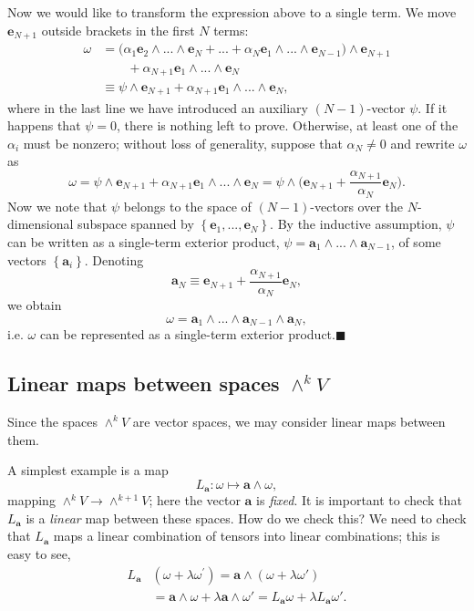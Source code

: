 Now we would like to transform the expression above to a single term.
We move $\mathbf{e}_{N+1}$ outside brackets in the first $N$ terms:\begin{align*}
\omega & =\big(\alpha_{1}\mathbf{e}_{2}\wedge...\wedge\mathbf{e}_{N}+...+\alpha_{N}\mathbf{e}_{1}\wedge...\wedge\mathbf{e}_{N-1}\big)\wedge\mathbf{e}_{N+1}\\
 & \qquad+\alpha_{N+1}\mathbf{e}_{1}\wedge...\wedge\mathbf{e}_{N}\\
 & \equiv\psi\wedge\mathbf{e}_{N+1}+\alpha_{N+1}\mathbf{e}_{1}\wedge...\wedge\mathbf{e}_{N},\end{align*}
where in the last line we have introduced an auxiliary $(N-1)$-vector
$\psi$. If it happens that $\psi=0$, there is nothing left to prove.
Otherwise, at least one of the $\alpha_{i}$ must be nonzero; without
loss of generality, suppose that $\alpha_{N}\neq0$ and rewrite $\omega$
as \[
\omega=\psi\wedge\mathbf{e}_{N+1}+\alpha_{N+1}\mathbf{e}_{1}\wedge...\wedge\mathbf{e}_{N}=\psi\wedge\big(\mathbf{e}_{N+1}+\frac{\alpha_{N+1}}{\alpha_{N}}\mathbf{e}_{N}\big).\]
Now we note that $\psi$ belongs to the space of $\left(N-1\right)$-vectors
over the $N$-dimen\-sion\-al subspace spanned by $\left\{ \mathbf{e}_{1},...,\mathbf{e}_{N}\right\} $.
By the inductive assumption, $\psi$ can be written as a single-term
exterior product, $\psi=\mathbf{a}_{1}\wedge...\wedge\mathbf{a}_{N-1}$,
of some vectors $\left\{ \mathbf{a}_{i}\right\} $. Denoting \[
\mathbf{a}_{N}\equiv\mathbf{e}_{N+1}+\frac{\alpha_{N+1}}{\alpha_{N}}\mathbf{e}_{N},\]
we obtain \[
\omega=\mathbf{a}_{1}\wedge...\wedge\mathbf{a}_{N-1}\wedge\mathbf{a}_{N},\]
i.e. $\omega$ can be represented as a single-term exterior product.\hfill{}$\blacksquare$ 


\subsection{Linear maps between spaces $\wedge^{k}V$\label{sub:Linear-maps-between-spaces}}

Since the spaces $\wedge^{k}V$ are vector spaces, we may consider
linear maps between them. 

A simplest example is a map\[
L_{\mathbf{a}}:\omega\mapsto\mathbf{a}\wedge\omega,\]
mapping $\wedge^{k}V\rightarrow\wedge^{k+1}V$; here the vector $\mathbf{a}$
is \emph{fixed}. It is important to check that $L_{\mathbf{a}}$ is
a \emph{linear} map between these spaces. How do we check this? We
need to check that $L_{\mathbf{a}}$ maps a linear combination of
tensors into linear combinations; this is easy to see,\begin{align*}
L_{\mathbf{a}} & (\omega+\lambda\omega^{\prime})=\mathbf{a}\wedge(\omega+\lambda\omega')\\
 & =\mathbf{a}\wedge\omega+\lambda\mathbf{a}\wedge\omega'=L_{\mathbf{a}}\omega+\lambda L_{\mathbf{a}}\omega'.\end{align*}


